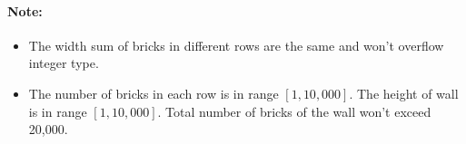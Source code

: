  

\paragraph{Note:}

\begin{itemize}
\item The width sum of bricks in different rows are the same and won't overflow integer type.
\item The number of bricks in each row is in range $[1,10,000]$. The height of wall is in range $[1,10,000]$. Total number of bricks of the wall won't exceed 20,000.
\end{itemize}
